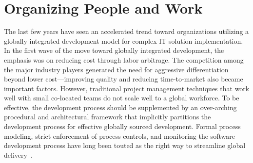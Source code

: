 \section{Organizing People and Work}
\label{sec:global}


The last few years have seen an accelerated trend toward organizations utilizing
a globally integrated development model for complex IT solution
implementation. In the first wave of the move toward globally integrated
development, the emphasis was on reducing cost through labor arbitrage.  The
competition among the major industry players generated the need for aggressive
differentiation beyond lower cost---improving quality and reducing
time-to-market also became important factors. However, traditional project
management techniques that work well with small co-located teams do not scale
well to a global workforce.  To be effective, the development process should be
supplemented by an over-arching procedural and architectural framework that
implicitly partitions the development process for effective globally sourced
development. Formal process modeling, strict enforcement of process controls,
and monitoring the software development process have long been touted as the
right way to streamline global delivery~\cite{glo32}.

